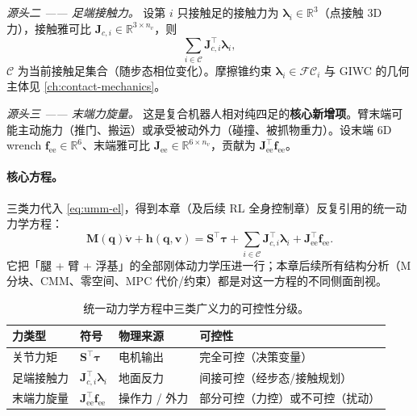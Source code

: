 \emph{源头二 —— 足端接触力。}\;
设第 $i$ 只接触足的接触力为 $\boldsymbol\lambda_i\in\mathbb R^3$（点接触 $3$D 力），接触雅可比 $\mathbf J_{c,i}\in\mathbb R^{3\times n_v}$，则
\begin{equation}
  \sum_{i\in\mathcal C}\mathbf J_{c,i}^\top\boldsymbol\lambda_i,
  \label{eq:umm-contact}
\end{equation}
$\mathcal C$ 为当前接触足集合（随步态相位变化）。摩擦锥约束 $\boldsymbol\lambda_i\in\mathcal{FC}_i$ 与 GIWC 的几何主体见 \cref{ch:contact-mechanics}。

\emph{源头三 —— 末端力旋量。}\;
这是复合机器人相对纯四足的\textbf{核心新增项}。臂末端可能主动施力（推门、搬运）或承受被动外力（碰撞、被抓物重力）。设末端 $6$D wrench $\mathbf f_{\text{ee}}\in\mathbb R^6$、末端雅可比 $\mathbf J_{\text{ee}}\in\mathbb R^{6\times n_v}$，贡献为 $\mathbf J_{\text{ee}}^\top\mathbf f_{\text{ee}}$。

\paragraph{核心方程。}
三类力代入 \cref{eq:umm-el}，得到本章（及后续 RL 全身控制章）反复引用的统一动力学方程：
\begin{equation}
  \boxed{\;
  \mathbf M(\mathbf q)\dot{\mathbf v}+\mathbf h(\mathbf q,\mathbf v)
  =\mathbf S^\top\boldsymbol\tau+\sum_{i\in\mathcal C}\mathbf J_{c,i}^\top\boldsymbol\lambda_i+\mathbf J_{\text{ee}}^\top\mathbf f_{\text{ee}}.
  \;}
  \label{eq:umm-core}
\end{equation}
它把「腿 + 臂 + 浮基」的全部刚体动力学压进一行；本章后续所有结构分析（M 分块、CMM、零空间、MPC 代价/约束）都是对这一方程的不同侧面剖视。

\begin{table}[H]\centering\small
\caption{统一动力学方程中三类广义力的可控性分级。}
\label{tab:umm-forces}
\begin{tabular}{llll}
\toprule
力类型 & 符号 & 物理来源 & 可控性 \\
\midrule
关节力矩 & $\mathbf S^\top\boldsymbol\tau$ & 电机输出 & 完全可控（决策变量） \\
足端接触力 & $\mathbf J_{c,i}^\top\boldsymbol\lambda_i$ & 地面反力 & 间接可控（经步态/接触规划） \\
末端力旋量 & $\mathbf J_{\text{ee}}^\top\mathbf f_{\text{ee}}$ & 操作力 / 外力 & 部分可控（力控）或不可控（扰动） \\
\bottomrule
\end{tabular}
\end{table}

